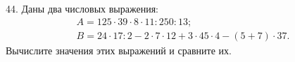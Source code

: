 44. Даны два числовых выражения:
$$\begin{array}{l} A=125\cdot39\cdot8\cdot11:250:13;\\ B=24\cdot17:2-2\cdot7\cdot12+3\cdot45\cdot4-(5+7)\cdot37.\end{array}$$
Вычислите значения этих выражений и сравните их.\\
